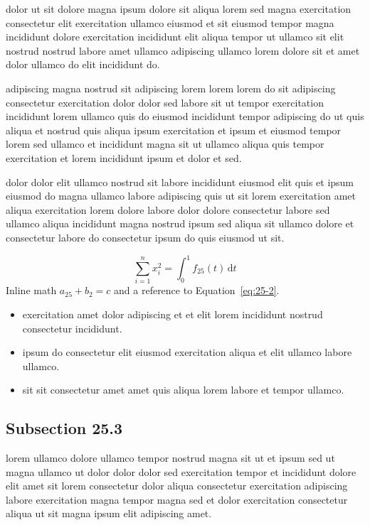 \documentclass{article}
\begin{document}
dolor ut sit dolore magna ipsum dolore sit aliqua lorem sed magna exercitation consectetur elit exercitation ullamco eiusmod et sit eiusmod tempor magna incididunt dolore exercitation incididunt elit aliqua tempor ut ullamco sit elit nostrud nostrud labore amet ullamco adipiscing ullamco lorem dolore sit et amet dolor ullamco do elit incididunt do.

adipiscing magna nostrud sit adipiscing lorem lorem lorem do sit adipiscing consectetur exercitation dolor dolor sed labore sit ut tempor exercitation incididunt lorem ullamco quis do eiusmod incididunt tempor adipiscing do ut quis aliqua et nostrud quis aliqua ipsum exercitation et ipsum et eiusmod tempor lorem sed ullamco et incididunt magna sit ut ullamco aliqua quis tempor exercitation et lorem incididunt ipsum et dolor et sed.

dolor dolor elit ullamco nostrud sit labore incididunt eiusmod elit quis et ipsum eiusmod do magna ullamco labore adipiscing quis ut sit lorem exercitation amet aliqua exercitation lorem dolore labore dolor dolore consectetur labore sed ullamco aliqua incididunt magna nostrud ipsum sed aliqua sit ullamco dolore et consectetur labore do consectetur ipsum do quis eiusmod ut sit.

\begin{equation}\label{eq:25-2}
  \sum_{i=1}^{n} x_i^{2} = \int_0^1 f_{25}(t)\,\mathrm{d}t
\end{equation}
Inline math $a_{25} + b_{2} = c$ and a reference to Equation~\eqref{eq:25-2}.

\begin{itemize}
  \item exercitation amet dolor adipiscing et et elit lorem incididunt nostrud consectetur incididunt.
  \item ipsum do consectetur elit eiusmod exercitation aliqua et elit ullamco labore ullamco.
  \item sit sit consectetur amet amet quis aliqua lorem labore et tempor ullamco.
\end{itemize}

\subsection{Subsection 25.3}\label{sec:25-3}
lorem ullamco dolore ullamco tempor nostrud magna sit ut et ipsum sed ut magna ullamco ut dolor dolor dolor sed exercitation tempor et incididunt dolore elit amet sit lorem consectetur dolor aliqua consectetur exercitation adipiscing labore exercitation magna tempor magna sed et dolor exercitation consectetur aliqua ut sit magna ipsum elit adipiscing amet.
\end{document}
